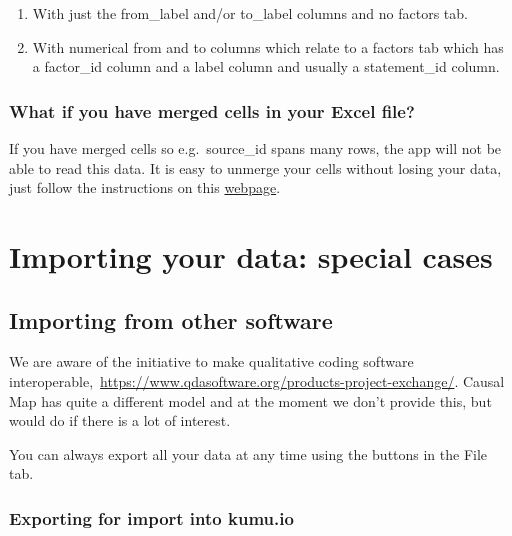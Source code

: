 \documentclass[
]{book}
\providecommand{\tightlist}{%
  \setlength{\itemsep}{0pt}\setlength{\parskip}{0pt}}
\begin{document}
\begin{enumerate}
\def\labelenumi{\arabic{enumi}.}
\tightlist
\item
  With just the from\_label and/or to\_label columns and no factors tab.
\item
  With numerical from and to columns which relate to a factors tab which has a factor\_id column and a label column and usually a statement\_id column.
\end{enumerate}

\hypertarget{what-if-you-have-merged-cells-in-your-excel-file}{%
\subsection{What if you have merged cells in your Excel file?}\label{what-if-you-have-merged-cells-in-your-excel-file}}

If you have merged cells so e.g.~source\_id spans many rows, the app will not be able to read this data. It is easy to unmerge your cells without losing your data, just follow the instructions on this \href{https://www.extendoffice.com/documents/excel/1139-excel-unmerge-cells-and-fill.html}{webpage}.

\hypertarget{ximport-other}{%
\chapter{Importing your data: special cases}\label{ximport-other}}

\hypertarget{importing-from-other-software}{%
\section{Importing from other software}\label{importing-from-other-software}}

We are aware of the initiative to make qualitative coding software interoperable,~\url{https://www.qdasoftware.org/products-project-exchange/}. Causal Map has quite a different model and at the moment we don't provide this, but would do if there is a lot of interest.

You can always export all your data at any time using the buttons in the File tab.

\hypertarget{exporting-for-import-into-kumu.io}{%
\subsection{Exporting for import into kumu.io}\label{exporting-for-import-into-kumu.io}}
\end{document}
